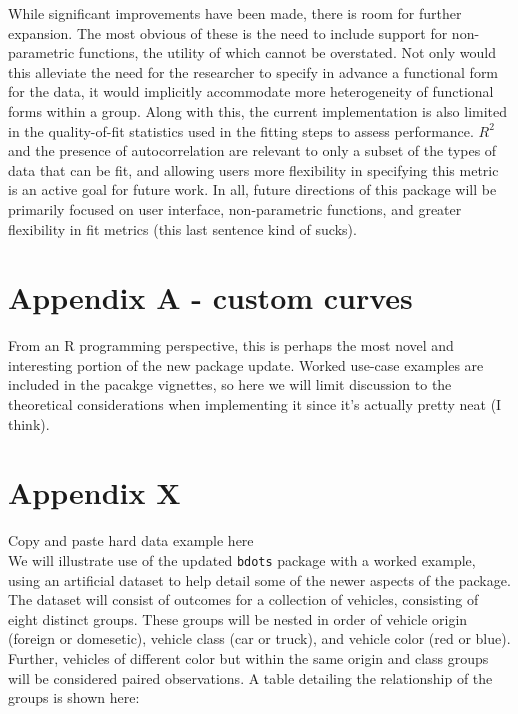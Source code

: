 \documentclass{article}
\newcommand{\xt}{\texttt}%
\begin{document}
While significant improvements have been made, there is room for further expansion. The most obvious of these is the need to include support for non-parametric functions, the utility of which cannot be overstated. Not only would this alleviate the need for the researcher to specify in advance a functional form for the data, it would implicitly accommodate more heterogeneity of functional forms within a group. Along with this, the current implementation is also limited in the quality-of-fit statistics used in the fitting steps to assess performance. $R^2$ and the presence of autocorrelation are relevant to only a subset of the types of data that can be fit, and allowing users more flexibility in specifying this metric is an active goal for future work. In all, future directions of this package will be primarily focused on user interface, non-parametric functions, and greater flexibility in fit metrics (this last sentence kind of sucks).



\appendix

\section*{Appendix A - custom curves}

From an R programming perspective, this is perhaps the most novel and interesting portion of the new package update. Worked use-case examples are included in the pacakge vignettes, so here we will limit discussion to the theoretical considerations when implementing it since it's actually pretty neat (I think). 



\section*{Appendix X} Copy and paste hard data example here \\

We will illustrate use of the updated \xt{bdots} package with a worked example, using an artificial dataset to help detail some of the newer aspects of the package. The dataset will consist of outcomes for a collection of vehicles, consisting of eight distinct groups. These groups will be nested in order of vehicle origin (foreign or domesetic), vehicle class (car or truck), and vehicle color (red or blue). Further, vehicles of different color but within the same origin and class groups will be considered paired observations. A table detailing the relationship of the groups is shown here:
\end{document}

